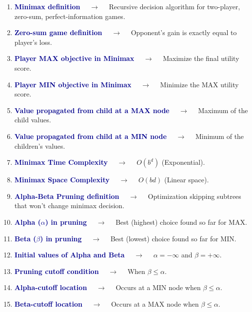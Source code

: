 \documentclass[11pt,a4paper]{article}
\begin{document}
\begin{enumerate}[label=\arabic*., leftmargin=*, labelsep=0.8em, itemsep=0.35em, parsep=0.1em, topsep=0.2em]
  \item \textcolor{darkblue}{\textbf{Minimax definition}} $\quad\to\quad$ Recursive decision algorithm for two-player, zero-sum, perfect-information games.
  \item \textcolor{darkblue}{\textbf{Zero-sum game definition}} $\quad\to\quad$ Opponent's gain is exactly equal to player's loss.
  \item \textcolor{darkblue}{\textbf{Player MAX objective in Minimax}} $\quad\to\quad$ Maximize the final utility score.
  \item \textcolor{darkblue}{\textbf{Player MIN objective in Minimax}} $\quad\to\quad$ Minimize the MAX utility score.
  \item \textcolor{darkblue}{\textbf{Value propagated from child at a MAX node}} $\quad\to\quad$ Maximum of the child values.
  \item \textcolor{darkblue}{\textbf{Value propagated from child at a MIN node}} $\quad\to\quad$ Minimum of the children's values.
  \item \textcolor{darkblue}{\textbf{Minimax Time Complexity}} $\quad\to\quad$ $O(b^d)$ (Exponential).
  \item \textcolor{darkblue}{\textbf{Minimax Space Complexity}} $\quad\to\quad$ $O(bd)$ (Linear space).
  \item \textcolor{darkblue}{\textbf{Alpha-Beta Pruning definition}} $\quad\to\quad$ Optimization skipping subtrees that won't change minimax decision.
  \item \textcolor{darkblue}{\textbf{Alpha ($\alpha$) in pruning}} $\quad\to\quad$ Best (highest) choice found so far for MAX.
  \item \textcolor{darkblue}{\textbf{Beta ($\beta$) in pruning}} $\quad\to\quad$ Best (lowest) choice found so far for MIN.
  \item \textcolor{darkblue}{\textbf{Initial values of Alpha and Beta}} $\quad\to\quad$ $\alpha = -\infty$ and $\beta = +\infty$.
  \item \textcolor{darkblue}{\textbf{Pruning cutoff condition}} $\quad\to\quad$ When $\beta \le \alpha$.
  \item \textcolor{darkblue}{\textbf{Alpha-cutoff location}} $\quad\to\quad$ Occurs at a MIN node when $\beta \le \alpha$.
  \item \textcolor{darkblue}{\textbf{Beta-cutoff location}} $\quad\to\quad$ Occurs at a MAX node when $\beta \le \alpha$.

\end{enumerate}
\end{document}

